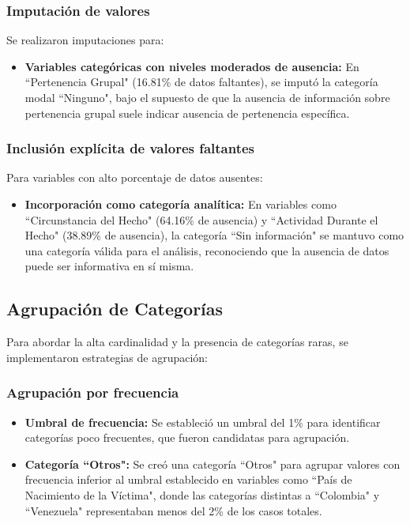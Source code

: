 \documentclass[lettersize,journal]{IEEEtran}
\begin{document}
\subsubsection{Imputación de valores}
Se realizaron imputaciones para:
\begin{itemize}
\item \textbf{Variables categóricas con niveles moderados de ausencia:} En ``Pertenencia Grupal" (16.81\% de datos faltantes), se imputó la categoría modal ``Ninguno", bajo el supuesto de que la ausencia de información sobre pertenencia grupal suele indicar ausencia de pertenencia específica.
\end{itemize}
\subsubsection{Inclusión explícita de valores faltantes}
Para variables con alto porcentaje de datos ausentes:
\begin{itemize}
\item \textbf{Incorporación como categoría analítica:} En variables como ``Circunstancia del Hecho" (64.16\% de ausencia) y ``Actividad Durante el Hecho" (38.89\% de ausencia), la categoría ``Sin información" se mantuvo como una categoría válida para el análisis, reconociendo que la ausencia de datos puede ser informativa en sí misma.
\end{itemize}
\subsection{Agrupación de Categorías}
Para abordar la alta cardinalidad y la presencia de categorías raras, se implementaron estrategias de agrupación:
\subsubsection{Agrupación por frecuencia}
\begin{itemize}
\item \textbf{Umbral de frecuencia:} Se estableció un umbral del 1\% para identificar categorías poco frecuentes, que fueron candidatas para agrupación.
\item \textbf{Categoría ``Otros":} Se creó una categoría ``Otros" para agrupar valores con frecuencia inferior al umbral establecido en variables como ``País de Nacimiento de la Víctima", donde las categorías distintas a ``Colombia" y ``Venezuela" representaban menos del 2\% de los casos totales.
\end{itemize}
\end{document}
